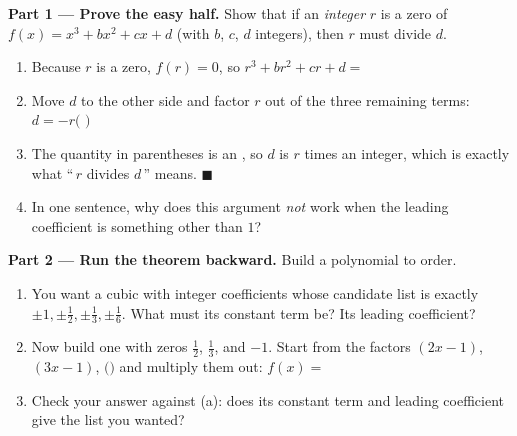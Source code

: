 \documentclass[10pt]{article}
\begin{document}
\begin{tcolorbox}[colback=white, colframe=black!40, title=\textbf{Tier E --- Extension},
    fonttitle=\bfseries, arc=1.5mm, left=3mm, right=3mm, top=2mm, bottom=2mm, breakable]
\textbf{Part 1 --- Prove the easy half.} Show that if an \emph{integer} $r$ is a zero of
$f(x) = x^3 + bx^2 + cx + d$ (with $b$, $c$, $d$ integers), then $r$ must divide $d$.
\begin{enumerate}[label=(\alph*), leftmargin=1.8em, itemsep=6pt]
  \item Because $r$ is a zero, $f(r) = 0$, so \; $r^3 + br^2 + cr + d = $ 
  \item Move $d$ to the other side and factor $r$ out of the three remaining terms:
        $d = -r\big($  $\big)$
  \item The quantity in parentheses is an , so $d$ is $r$ times an integer, which is
        exactly what ``\,$r$ divides $d$\,'' means. \; $\blacksquare$
  \item In one sentence, why does this argument \emph{not} work when the leading coefficient is
        something other than $1$? 
\end{enumerate}

\vspace{5pt}
\textbf{Part 2 --- Run the theorem backward.} Build a polynomial to order.
\begin{enumerate}[label=(\alph*), leftmargin=1.8em, itemsep=6pt]
  \item You want a cubic with integer coefficients whose candidate list is exactly
        $\pm 1, \pm\tfrac12, \pm\tfrac13, \pm\tfrac16$. What must its constant term be?
         \; Its leading coefficient? 
  \item Now build one with zeros $\tfrac12$, $\tfrac13$, and $-1$. Start from the factors
        $(2x-1)$, $(3x-1)$, $($$)$ and multiply them out:
        $f(x) = $ 
  \item Check your answer against (a): does its constant term and leading coefficient give the list
        you wanted? 
\end{enumerate}


\end{tcolorbox}
\end{document}
